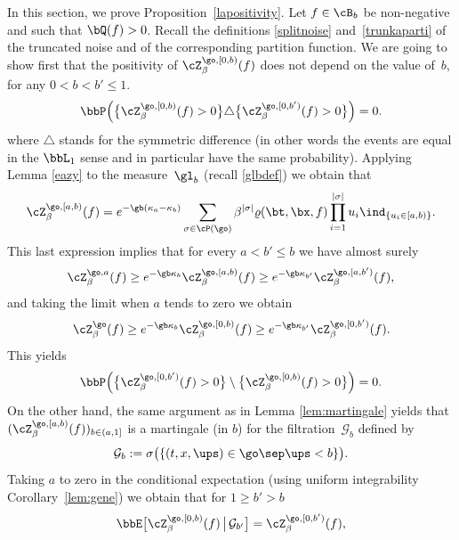 In this section, we prove Proposition~\ref{lapositivity}.
Let $f\in \cB_b$ be non-negative and such that $\bQ(f)> 0$.
Recall the definitions \eqref{splitnoise} and~\eqref{trunkaparti} of the truncated noise and of the corresponding partition function. We are going to show first that the positivity of $\cZ^{\go,[0,b)}_\beta (f)$ does not depend on the value of~$b$,
for any $ 0<b< b'\le 1$.
\begin{equation}\label{ekwalzs}
\bbP\Bigl(\bigl\{ \cZ^{\go,[0,b)}_\beta (f)>0 \bigr\} \triangle \bigl\{ \cZ^{\go,[0,b')}_\beta (f) >0 \bigr\} \Bigr) =0.
\end{equation}
where $\triangle$ stands for the symmetric difference (in other words the events are equal in the $\bbL_1$ sense and in particular have the same probability).
Applying Lemma \ref{eazy} to the measure~$\gl_b$ (recall \eqref{glbdef}) we obtain that
\begin{equation}
\cZ^{\go,[a,b)}_\beta(f)= e^{-\gb (\kappa_a-\kappa_b)} \sum_{\sigma\in \cP(\go)} \beta^{|\sigma|} \varrho(\bt,\bx, f) \prod_{i=1}^{|\sigma|} u_i\ind_{\{ u_i\in[a,b) \}}.
\end{equation}
This last expression implies that for every $a<b' \leq b$ we have almost surely
\begin{equation}
\label{eq:ZaZab}
\cZ^{\go,a}_\beta (f) \ge e^{-\gb\kappa_b}\cZ^{\go,[a,b)}_\beta (f) \ge e^{-\gb\kappa_{b'}} \cZ^{\go,[a,b')}_\beta (f),
\end{equation}
and taking the limit when $a$ tends to zero we obtain
\begin{equation}
\cZ^{\go}_\beta (f) \ge e^{-\gb\kappa_b} \cZ^{\go,[0,b)}_\beta (f) \ge e^{-\gb\kappa_{b'}} \cZ^{\go,[0,b')}_\beta (f).
\end{equation}
This yields
\[
\bbP\Bigl(\bigl\{ \cZ^{\go,[0,b')}_\beta (f)>0 \bigr\} \setminus \bigl\{ \cZ^{\go,[0,b)}_\beta (f) >0 \bigr\} \Bigr) =0.
\]
On the other hand, the same argument as in Lemma \ref{lem:martingale} yields that $
(\cZ^{\go,[a,b)}_\beta (f))_{b\in(a,1]}$ is a martingale (in $b$) for the filtration~$\mathcal{G}_b$ defined by
\begin{equation}
\mathcal G_b:= \sigma \bigl(\{ (t,x,\ups)\in \go \sep \ups <b \}\bigr).
\end{equation}
Taking $a$ to zero in the conditional expectation (using uniform integrability \cf Corol\-lary~\ref{lem:gene}) we obtain that for $1\geq b'>b$
\begin{equation}
\bbE \bigl[ \cZ^{\go,[0, b)}_\beta (f) \, \big| \, \mathcal G_{ b'} \bigr]= \cZ^{\go,[0, b')}_\beta (f),
\end{equation}

